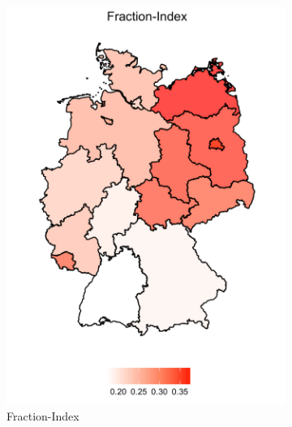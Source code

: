 \documentclass[a4paper]{article}
\begin{document}
{\begin{figure}
\begin{subfigure}[h]{0.33\linewidth}
\includegraphics[width=\textwidth]{q6/plot-fraction.pdf}
\caption{Fraction-Index}
\end{subfigure}%
\hfill
\begin{subfigure}[h]{0.33\linewidth}

\end{subfigure}
\end{figure}}
\end{document}
